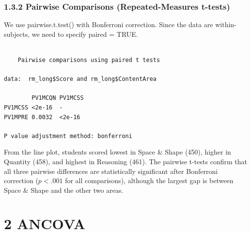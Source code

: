 \documentclass[
  letterpaper,
  DIV=11,
  numbers=noendperiod]{scrreprt}
\newenvironment{Shaded}{\begin{snugshade}}{\end{snugshade}}
\newcommand{\AttributeTok}[1]{\textcolor[rgb]{0.40,0.45,0.13}{#1}}
\newcommand{\CommentTok}[1]{\textcolor[rgb]{0.37,0.37,0.37}{#1}}
\newcommand{\ConstantTok}[1]{\textcolor[rgb]{0.56,0.35,0.01}{#1}}
\newcommand{\FunctionTok}[1]{\textcolor[rgb]{0.28,0.35,0.67}{#1}}
\newcommand{\NormalTok}[1]{\textcolor[rgb]{0.00,0.23,0.31}{#1}}
\newcommand{\OtherTok}[1]{\textcolor[rgb]{0.00,0.23,0.31}{#1}}
\newcommand{\SpecialCharTok}[1]{\textcolor[rgb]{0.37,0.37,0.37}{#1}}
\newcommand{\StringTok}[1]{\textcolor[rgb]{0.13,0.47,0.30}{#1}}
\begin{document}
\subsubsection*{1.3.2 Pairwise Comparisons (Repeated-Measures
t-tests)}\label{pairwise-comparisons-repeated-measures-t-tests}

We use pairwise.t.test() with Bonferroni correction. Since the data are
within-subjects, we need to specify paired = TRUE.

\begin{Shaded}
\end{Shaded}

\begin{verbatim}

    Pairwise comparisons using paired t tests 

data:  rm_long$Score and rm_long$ContentArea 

        PV1MCQN PV1MCSS
PV1MCSS <2e-16  -      
PV1MPRE 0.0032  <2e-16 

P value adjustment method: bonferroni 
\end{verbatim}

From the line plot, students scored lowest in Space \& Shape (450),
higher in Quantity (458), and highest in Reasoning (461). The pairwise
t-tests confirm that all three pairwise differences are statistically
significant after Bonferroni correction (\(p < .001\) for all
comparisons), although the largest gap is between Space \& Shape and the
other two areas.

\section*{2 ANCOVA}\label{ancova}

\end{document}
